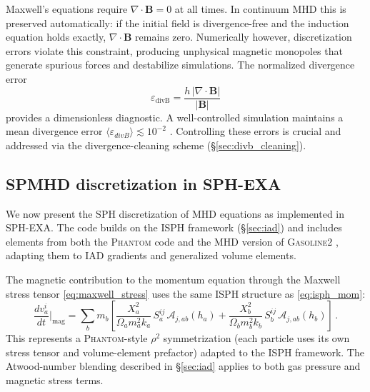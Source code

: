 Maxwell's equations require $\nabla \cdot \mathbf{B} = 0$ at all times. In continuum MHD this is preserved automatically: if the initial field is divergence-free and the induction equation holds exactly, $\nabla \cdot \mathbf{B}$ remains zero. Numerically however, discretization errors violate this constraint, producing unphysical magnetic monopoles that generate spurious forces and destabilize simulations. The normalized divergence error
\begin{equation}
    \varepsilon_{\mathrm{divB}} = \frac{h\,|\nabla \cdot \mathbf{B}|}{|\mathbf{B}|}
    \label{eq:divb_error}
\end{equation}
provides a dimensionless diagnostic. A well-controlled simulation maintains a mean divergence error $\langle \varepsilon_{divB}\rangle \lesssim 10^{-2}$ \cite{WissingShen2020, Price2018}. Controlling these errors is crucial and addressed via the divergence-cleaning scheme (§\ref{sec:divb_cleaning}).

\subsection{SPMHD discretization in SPH-EXA}
\label{sec:spmhd}

We now present the SPH discretization of MHD equations as implemented in SPH-EXA. The code builds on the ISPH framework (\S\ref{sec:iad}) and includes elements from both the \textsc{Phantom} code \cite{Price2018} and the MHD version of \textsc{Gasoline2} \cite{WissingShen2020}, adapting them to IAD gradients and generalized volume elements.


The magnetic contribution to the momentum equation through the Maxwell stress tensor \eqref{eq:maxwell_stress} uses the same ISPH structure as \eqref{eq:isph_mom}:
\begin{equation}
    \frac{dv^i_a}{dt}\bigg|_\mathrm{mag} = \sum_b m_b \left[ \frac{X_a^2}{\Omega_a m_a^2 k_a}\, S_a^{ij}\, \mathcal{A}_{j,ab}(h_a) + \frac{X_b^2}{\Omega_b m_b^2 k_b}\, S_b^{ij}\, \mathcal{A}_{j,ab}(h_b) \right]\,.
    \label{eq:spmhd_mom}
\end{equation}
This represents a \textsc{Phantom}-style $\rho^2$ symmetrization (each particle uses its own stress tensor and volume-element prefactor) adapted to the ISPH framework. %
The Atwood-number blending described in \S\ref{sec:iad} applies to both gas pressure and magnetic stress terms.

